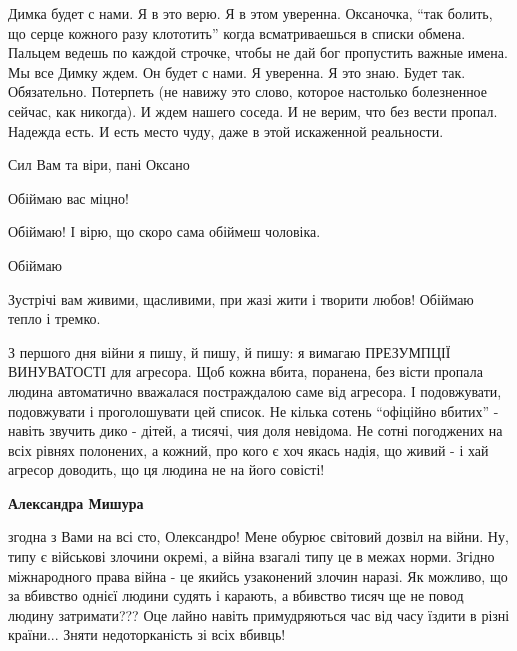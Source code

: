 Димка будет с нами. Я в это верю. Я в этом уверенна. Оксаночка, \enquote{так болить, що
серце кожного разу клототить} когда всматриваешься в списки обмена. Пальцем
ведешь по каждой строчке, чтобы не дай бог пропустить важные имена. Мы все
Димку ждем. Он будет с нами. Я уверенна. Я это знаю. Будет так. Обязательно.
Потерпеть (не навижу это слово, которое настолько болезненное сейчас, как
никогда). И ждем нашего соседа. И не верим, что без вести пропал. Надежда есть.
И есть место чуду, даже в этой искаженной реальности.


Сил Вам та віри, пані Оксано


Обіймаю вас міцно!


Обіймаю! І вірю, що скоро сама обіймеш чоловіка.


Обіймаю 🧡


Зустрічі вам живими, щасливими, при жазі жити і творити любов! Обіймаю тепло і тремко.


З першого дня війни я пишу, й пишу, й пишу: я вимагаю ПРЕЗУМПЦІЇ ВИНУВАТОСТІ
для агресора. Щоб кожна вбита, поранена, без вісти пропала людина автоматично
вважалася постраждалою саме від агресора. І подовжувати, подовжувати і
проголошувати цей список. Не кілька сотень \enquote{офіційно вбитих} - навіть звучить
дико - дітей, а тисячі, чия доля невідома. Не сотні погоджених на всіх рівнях
полонених, а кожний, про кого є хоч якась надія, що живий - і хай агресор
доводить, що ця людина не на його совісті!

\begin{itemize} %
\textbf{Александра Мишура} 

згодна з Вами на всі сто, Олександро! Мене обурює світовий дозвіл на війни. Ну,
типу є військові злочини окремі, а війна взагалі типу це в межах норми. Згідно
міжнародного права війна - це якийсь узаконений злочин наразі. Як можливо, що
за вбивство однієї людини судять і карають, а вбивство тисяч ще не повод людину
затримати??? Оце лайно навіть примудряються час від часу їздити в різні
країни... Зняти недоторканість зі всіх вбивць!

\end{itemize} %

